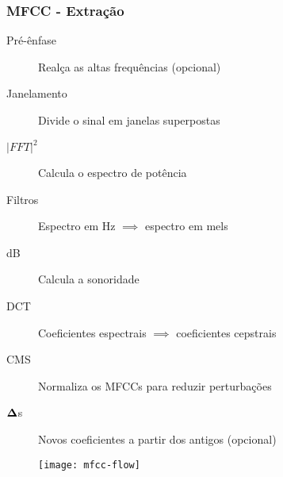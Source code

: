 \begin{frame}
\frametitle{MFCC - Extração}
\begin{description}
    \item[Pré-ênfase] Realça as altas frequências (opcional)
    \pause
    \item[Janelamento] Divide o sinal em janelas superpostas
    \pause
    \item[$|FFT|^2$] Calcula o espectro de potência
    \pause
    \item[Filtros] Espectro em Hz $\implies$ espectro em mels
    \pause
    \item[dB] Calcula a sonoridade
    \pause
    \item[DCT] Coeficientes espectrais $\implies$ coeficientes cepstrais
    \pause
    \item[CMS] Normaliza os MFCCs para reduzir perturbações
    \pause
    \item[$\boldsymbol{\Delta}$s] Novos coeficientes a partir dos antigos (opcional)
    \pause
\end{description}

\begin{figure}[ht]
    \centering
    \texttt{[image: mfcc-flow]}
\end{figure}
\end{frame}